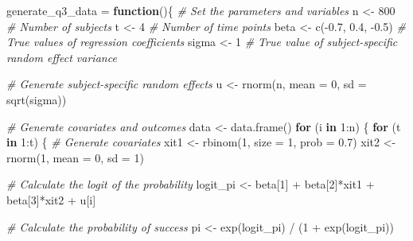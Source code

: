 \documentclass[
]{article}
\newenvironment{Shaded}{\begin{snugshade}}{\end{snugshade}}
\newcommand{\AttributeTok}[1]{\textcolor[rgb]{0.77,0.63,0.00}{#1}}
\newcommand{\CommentTok}[1]{\textcolor[rgb]{0.56,0.35,0.01}{\textit{#1}}}
\newcommand{\ControlFlowTok}[1]{\textcolor[rgb]{0.13,0.29,0.53}{\textbf{#1}}}
\newcommand{\DecValTok}[1]{\textcolor[rgb]{0.00,0.00,0.81}{#1}}
\newcommand{\FloatTok}[1]{\textcolor[rgb]{0.00,0.00,0.81}{#1}}
\newcommand{\FunctionTok}[1]{\textcolor[rgb]{0.00,0.00,0.00}{#1}}
\newcommand{\NormalTok}[1]{#1}
\newcommand{\OtherTok}[1]{\textcolor[rgb]{0.56,0.35,0.01}{#1}}
\newcommand{\SpecialCharTok}[1]{\textcolor[rgb]{0.00,0.00,0.00}{#1}}
\begin{document}
\begin{Shaded}
\begin{Highlighting}[]
\NormalTok{generate\_q3\_data }\OtherTok{=} \ControlFlowTok{function}\NormalTok{()\{}
  \CommentTok{\# Set the parameters and variables}
\NormalTok{  n }\OtherTok{\textless{}{-}} \DecValTok{800}  \CommentTok{\# Number of subjects}
\NormalTok{  t }\OtherTok{\textless{}{-}} \DecValTok{4}    \CommentTok{\# Number of time points}
\NormalTok{  beta }\OtherTok{\textless{}{-}} \FunctionTok{c}\NormalTok{(}\SpecialCharTok{{-}}\FloatTok{0.7}\NormalTok{, }\FloatTok{0.4}\NormalTok{, }\SpecialCharTok{{-}}\FloatTok{0.5}\NormalTok{)  }\CommentTok{\# True values of regression coefficients}
\NormalTok{  sigma }\OtherTok{\textless{}{-}} \DecValTok{1}  \CommentTok{\# True value of subject{-}specific random effect variance}
  
  \CommentTok{\# Generate subject{-}specific random effects}
\NormalTok{  u }\OtherTok{\textless{}{-}} \FunctionTok{rnorm}\NormalTok{(n, }\AttributeTok{mean =} \DecValTok{0}\NormalTok{, }\AttributeTok{sd =} \FunctionTok{sqrt}\NormalTok{(sigma))}
  
  \CommentTok{\# Generate covariates and outcomes}
\NormalTok{  data }\OtherTok{\textless{}{-}} \FunctionTok{data.frame}\NormalTok{()}
  \ControlFlowTok{for}\NormalTok{ (i }\ControlFlowTok{in} \DecValTok{1}\SpecialCharTok{:}\NormalTok{n) \{}
    \ControlFlowTok{for}\NormalTok{ (t }\ControlFlowTok{in} \DecValTok{1}\SpecialCharTok{:}\NormalTok{t) \{}
      \CommentTok{\# Generate covariates}
\NormalTok{      xit1 }\OtherTok{\textless{}{-}} \FunctionTok{rbinom}\NormalTok{(}\DecValTok{1}\NormalTok{, }\AttributeTok{size =} \DecValTok{1}\NormalTok{, }\AttributeTok{prob =} \FloatTok{0.7}\NormalTok{)}
\NormalTok{      xit2 }\OtherTok{\textless{}{-}} \FunctionTok{rnorm}\NormalTok{(}\DecValTok{1}\NormalTok{, }\AttributeTok{mean =} \DecValTok{0}\NormalTok{, }\AttributeTok{sd =} \DecValTok{1}\NormalTok{)}
      
      \CommentTok{\# Calculate the logit of the probability}
\NormalTok{      logit\_pi }\OtherTok{\textless{}{-}}\NormalTok{ beta[}\DecValTok{1}\NormalTok{] }\SpecialCharTok{+}\NormalTok{ beta[}\DecValTok{2}\NormalTok{]}\SpecialCharTok{*}\NormalTok{xit1 }\SpecialCharTok{+}\NormalTok{ beta[}\DecValTok{3}\NormalTok{]}\SpecialCharTok{*}\NormalTok{xit2 }\SpecialCharTok{+}\NormalTok{ u[i]}
      
      \CommentTok{\# Calculate the probability of success}
\NormalTok{      pi }\OtherTok{\textless{}{-}} \FunctionTok{exp}\NormalTok{(logit\_pi) }\SpecialCharTok{/}\NormalTok{ (}\DecValTok{1} \SpecialCharTok{+} \FunctionTok{exp}\NormalTok{(logit\_pi))}
      

\end{Highlighting}
\end{Shaded}
\end{document}
